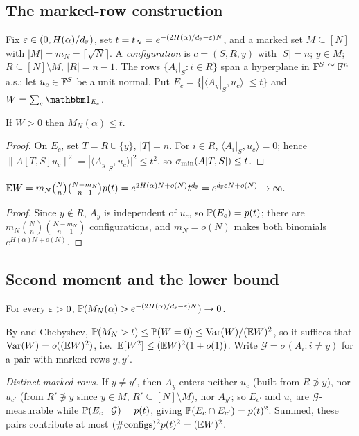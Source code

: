 \subsection{The marked-row construction}
Fix $\varepsilon\in(0,H(\alpha)/d_{\mathbb{F}})$, set $t=t_N=e^{-(2H(\alpha)/d_{\mathbb{F}}-\varepsilon)N}$, and a marked set
$M\subseteq[N]$ with $|M|=m_N=\lceil\sqrt N\rceil$. A \emph{configuration} is $c=(S,R,y)$ with $|S|=n$;
$y\in M$; $R\subseteq[N]\setminus M$, $|R|=n-1$. The rows $\{A_i|_S:i\in R\}$ span a hyperplane in
$\mathbb{F}^S\cong\mathbb{F}^n$ a.s.; let $u_c\in\mathbb{F}^S$ be a unit normal. Put
$E_c=\{|\langle A_y|_S,u_c\rangle|\le t\}$ and $W=\sum_c\one_{E_c}$.

\begin{lemma}\label{lem:suff}
If $W>0$ then $M_N(\alpha)\le t$.
\end{lemma}
\begin{proof}
On $E_c$, set $T=R\cup\{y\}$, $|T|=n$. For $i\in R$, $\langle A_i|_S,u_c\rangle=0$; hence
$\|A[T,S]u_c\|^2=|\langle A_y|_S,u_c\rangle|^2\le t^2$, so $\sigma_{\min}(A[T,S])\le t$.
\end{proof}

\begin{lemma}\label{lem:mean}
$\mathbb{E} W=m_N\binom Nn\binom{N-m_N}{n-1}p(t)=e^{2H(\alpha)N+o(N)}t^{d_{\mathbb{F}}}=e^{d_{\mathbb{F}}\varepsilon N+o(N)}\to\infty.$
\end{lemma}
\begin{proof}
Since $y\notin R$, $A_y$ is independent of $u_c$, so $\mathbb{P}(E_c)=p(t)$; there are
$m_N\binom Nn\binom{N-m_N}{n-1}$ configurations, and $m_N=o(N)$ makes both binomials $e^{H(\alpha)N+o(N)}$.
\end{proof}

\subsection{Second moment and the lower bound}
\begin{proposition}\label{prop:lower}
For every $\varepsilon>0$, $\mathbb{P}(M_N(\alpha)>e^{-(2H(\alpha)/d_{\mathbb{F}}-\varepsilon)N})\to0$.
\end{proposition}
By  and Chebyshev, $\mathbb{P}(M_N>t)\le\mathbb{P}(W=0)\le\operatorname{Var}(W)/(\mathbb{E} W)^2$, so it suffices that
$\operatorname{Var}(W)=o((\mathbb{E} W)^2)$, i.e.\ $\mathbb{E}[W^2]\le(\mathbb{E} W)^2(1+o(1))$. Write $\mathcal G=\sigma(A_i:i\ne y)$ for a
pair with marked rows $y,y'$.

\emph{Distinct marked rows.} If $y\ne y'$, then $A_y$ enters neither $u_c$ (built from $R\not\ni y$), nor
$u_{c'}$ (from $R'\not\ni y$ since $y\in M$, $R'\subseteq[N]\setminus M$), nor $A_{y'}$; so $E_{c'}$ and
$u_c$ are $\mathcal G$-measurable while $\mathbb{P}(E_c\mid\mathcal G)=p(t)$, giving $\mathbb{P}(E_c\cap E_{c'})=p(t)^2$.
Summed, these pairs contribute at most $(\#\text{configs})^2p(t)^2=(\mathbb{E} W)^2$.

